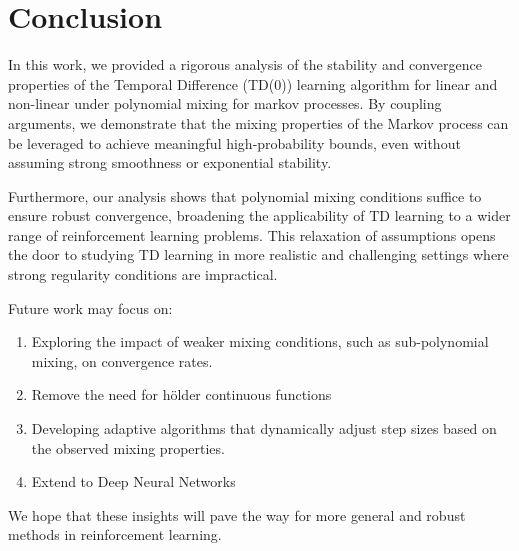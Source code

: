 \section{Conclusion}

In this work, we provided a rigorous analysis of the stability and convergence properties of the Temporal Difference (TD(0)) learning algorithm for linear and non-linear under polynomial mixing for markov processes. By coupling arguments, we demonstrate that the mixing properties of the Markov process can be leveraged to achieve meaningful high-probability bounds, even without assuming strong smoothness or exponential stability.

Furthermore, our analysis shows that polynomial mixing conditions suffice to ensure robust convergence, broadening the applicability of TD learning to a wider range of reinforcement learning problems. This relaxation of assumptions opens the door to studying TD learning in more realistic and challenging settings where strong regularity conditions are impractical.

Future work may focus on:
\begin{enumerate}
    \item Exploring the impact of weaker mixing conditions, such as sub-polynomial mixing, on convergence rates.
    \item Remove the need for h\"older continuous functions
    \item Developing adaptive algorithms that dynamically adjust step sizes based on the observed mixing properties.
    \item Extend to Deep Neural Networks
\end{enumerate}

We hope that these insights will pave the way for more general and robust methods in reinforcement learning.
